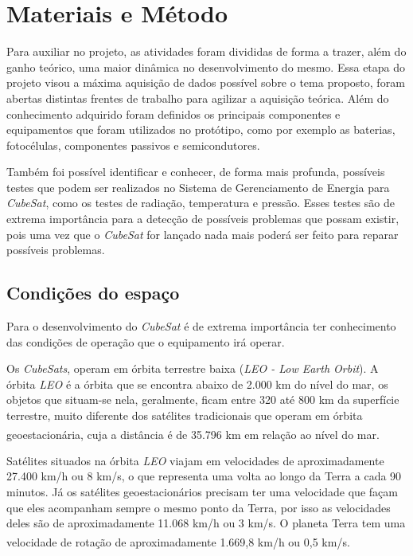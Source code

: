 \documentclass[
	12pt,				%
	openright,			%
	oneside,			%
	a4paper,			%
	english,			%
	french,				%
	spanish,			%
	brazil,				%
	oldfontcommands
	]{abntex2}
\begin{document}
\chapter[Materiais e Método]{Materiais e Método}

	Para auxiliar no projeto, as atividades foram divididas de forma a trazer, além do ganho teórico, uma maior dinâmica no desenvolvimento do mesmo. Essa etapa do projeto visou a máxima aquisição de dados possível sobre o tema proposto, foram abertas distintas frentes de trabalho para agilizar a aquisição teórica. Além do conhecimento adquirido foram definidos os principais componentes e equipamentos que foram utilizados no protótipo, como por exemplo as baterias, fotocélulas, componentes passivos e semicondutores.
	
	Também foi possível identificar e conhecer, de forma mais profunda, possíveis testes que podem ser realizados no Sistema de Gerenciamento de Energia para \textit{CubeSat}, como os testes de radiação, temperatura e pressão. Esses testes são de extrema importância para a detecção de possíveis problemas que possam existir, pois uma vez que o \textit{CubeSat} for lançado nada mais poderá ser feito para reparar possíveis problemas.
	
\section[Condições do espaço]{Condições do espaço}
	
	Para o desenvolvimento do \textit{CubeSat} é de extrema importância ter conhecimento das condições de operação que o equipamento irá operar.
	
	Os \textit{CubeSats}, operam em órbita terrestre baixa (\textit{LEO - Low Earth Orbit}). A órbita \textit{LEO} é a órbita que se encontra abaixo de 2.000 km do nível do mar, os objetos que situam-se nela, geralmente, ficam entre 320 até 800 km da superfície terrestre, muito diferente dos satélites tradicionais que operam em órbita geoestacionária, cuja a distância é de 35.796 km em relação ao nível do mar.\textsuperscript{\cite{LEO}}\textsuperscript{\cite{GEO}}
	
	Satélites situados na órbita \textit{LEO} viajam em velocidades de aproximadamente 27.400 km/h ou 8 km/s, o que representa uma volta ao longo da Terra a cada 90 minutos. Já os satélites geoestacionários precisam ter uma velocidade que façam que eles acompanham sempre o mesmo ponto da Terra, por isso as velocidades deles são de aproximadamente 11.068 km/h ou 3 km/s. O planeta Terra tem uma velocidade de rotação de aproximadamente 1.669,8 km/h ou 0,5 km/s.\textsuperscript{\cite{LEO}}\textsuperscript{\cite{GEO}}
	
\end{document}
